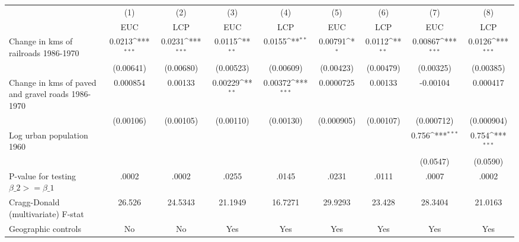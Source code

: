 {
\def\sym#1{\ifmmode^{#1}\else\(^{#1}\)\fi}
\begin{tabular}{l*{8}{c}}
\hline\hline
                &\multicolumn{1}{c}{(1)}&\multicolumn{1}{c}{(2)}&\multicolumn{1}{c}{(3)}&\multicolumn{1}{c}{(4)}&\multicolumn{1}{c}{(5)}&\multicolumn{1}{c}{(6)}&\multicolumn{1}{c}{(7)}&\multicolumn{1}{c}{(8)}\\
                &\multicolumn{1}{c}{EUC}&\multicolumn{1}{c}{LCP}&\multicolumn{1}{c}{EUC}&\multicolumn{1}{c}{LCP}&\multicolumn{1}{c}{EUC}&\multicolumn{1}{c}{LCP}&\multicolumn{1}{c}{EUC}&\multicolumn{1}{c}{LCP}\\
\hline
Change in kms of railroads 1986-1970&   0.0213\sym{***}&   0.0231\sym{***}&   0.0115\sym{**} &   0.0155\sym{**} &  0.00791\sym{*}  &   0.0112\sym{**} &  0.00867\sym{***}&   0.0126\sym{***}\\
                &(0.00641)         &(0.00680)         &(0.00523)         &(0.00609)         &(0.00423)         &(0.00479)         &(0.00325)         &(0.00385)         \\
[1em]
Change in kms of paved and gravel roads 1986-1970& 0.000854         &  0.00133         &  0.00229\sym{**} &  0.00372\sym{***}&0.0000725         &  0.00133         & -0.00104         & 0.000417         \\
                &(0.00106)         &(0.00105)         &(0.00110)         &(0.00130)         &(0.000905)         &(0.00107)         &(0.000712)         &(0.000904)         \\
[1em]
Log urban population 1960&                  &                  &                  &                  &                  &                  &    0.756\sym{***}&    0.754\sym{***}\\
                &                  &                  &                  &                  &                  &                  & (0.0547)         & (0.0590)         \\
\hline
P-value for testing $\beta\_{2} >= \beta\_{1}$&    .0002         &    .0002         &    .0255         &    .0145         &    .0231         &    .0111         &    .0007         &    .0002         \\
Cragg-Donald (multivariate) F-stat&   26.526         &  24.5343         &  21.1949         &  16.7271         &  29.9293         &   23.428         &  28.3404         &  21.0163         \\
Geographic controls&       No         &       No         &      Yes         &      Yes         &      Yes         &      Yes         &      Yes         &      Yes         \\

\end{tabular}}
